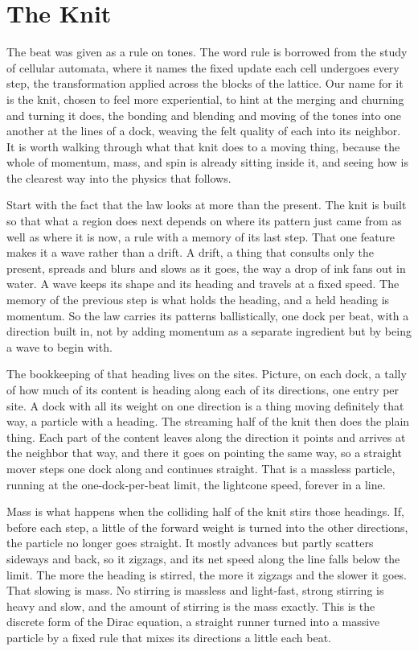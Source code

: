 \section{The Knit}

The beat was given as a rule on tones. The word rule is borrowed from the study of cellular automata, where it names the fixed update each cell undergoes every step, the transformation applied across the blocks of the lattice. Our name for it is the knit, chosen to feel more experiential, to hint at the merging and churning and turning it does, the bonding and blending and moving of the tones into one another at the lines of a dock, weaving the felt quality of each into its neighbor. It is worth walking through what that knit does to a moving thing, because the whole of momentum, mass, and spin is already sitting inside it, and seeing how is the clearest way into the physics that follows.

Start with the fact that the law looks at more than the present. The knit is built so that what a region does next depends on where its pattern just came from as well as where it is now, a rule with a memory of its last step. That one feature makes it a wave rather than a drift. A drift, a thing that consults only the present, spreads and blurs and slows as it goes, the way a drop of ink fans out in water. A wave keeps its shape and its heading and travels at a fixed speed. The memory of the previous step is what holds the heading, and a held heading is momentum. So the law carries its patterns ballistically, one dock per beat, with a direction built in, not by adding momentum as a separate ingredient but by being a wave to begin with.

The bookkeeping of that heading lives on the sites. Picture, on each dock, a tally of how much of its content is heading along each of its directions, one entry per site. A dock with all its weight on one direction is a thing moving definitely that way, a particle with a heading. The streaming half of the knit then does the plain thing. Each part of the content leaves along the direction it points and arrives at the neighbor that way, and there it goes on pointing the same way, so a straight mover steps one dock along and continues straight. That is a massless particle, running at the one-dock-per-beat limit, the lightcone speed, forever in a line.

Mass is what happens when the colliding half of the knit stirs those headings. If, before each step, a little of the forward weight is turned into the other directions, the particle no longer goes straight. It mostly advances but partly scatters sideways and back, so it zigzags, and its net speed along the line falls below the limit. The more the heading is stirred, the more it zigzags and the slower it goes. That slowing is mass. No stirring is massless and light-fast, strong stirring is heavy and slow, and the amount of stirring is the mass exactly. This is the discrete form of the Dirac equation, a straight runner turned into a massive particle by a fixed rule that mixes its directions a little each beat.

